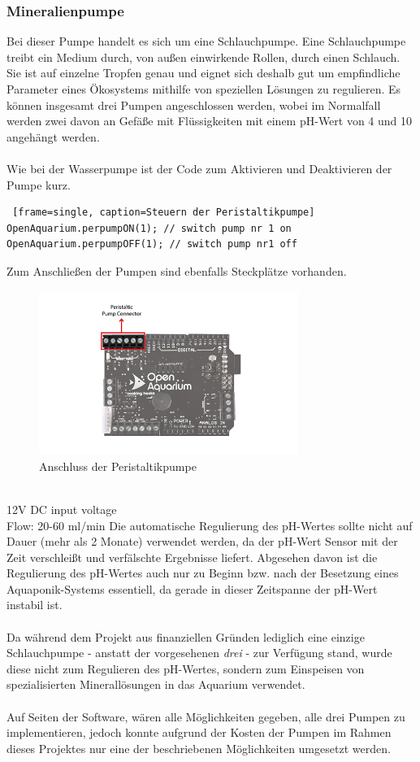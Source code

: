 \newpage
\subsubsection{Mineralienpumpe}
Bei dieser Pumpe handelt es sich um eine Schlauchpumpe. Eine Schlauchpumpe treibt ein Medium durch, von außen einwirkende Rollen, durch einen Schlauch. Sie ist auf einzelne Tropfen genau und eignet sich deshalb gut um  empfindliche Parameter eines Ökosystems mithilfe von speziellen Lösungen zu regulieren. Es können insgesamt drei Pumpen angeschlossen werden, wobei im Normalfall werden zwei davon an Gefäße mit Flüssigkeiten mit einem pH-Wert von 4 und 10 angehängt werden. \cite{hitec-zang} \\ \mbox{} \\
Wie bei der Wasserpumpe ist der Code zum Aktivieren und Deaktivieren der Pumpe kurz.
\begin{lstlisting} [frame=single, caption=Steuern der Peristaltikpumpe]
OpenAquarium.perpumpON(1); // switch pump nr 1 on
OpenAquarium.perpumpOFF(1); // switch pump nr1 off
\end{lstlisting}
Zum Anschließen der Pumpen sind ebenfalls Steckplätze vorhanden. \\
\begin{figure}[ht]
    \centering
    \includegraphics[height=2.1in]{images/mineral_pump_connection}
    \caption{Anschluss der Peristaltikpumpe}
\end{figure} \\
12V DC input voltage \\
Flow: 20-60 ml/min \cite{PeristaltikPump}
\newpage
{}
Die automatische Regulierung des pH-Wertes sollte nicht auf Dauer (mehr als 2 Monate) verwendet werden, da der pH-Wert Sensor mit der Zeit verschleißt und verfälschte Ergebnisse liefert. Abgesehen davon ist die Regulierung des pH-Wertes auch nur zu Beginn bzw. nach der Besetzung eines Aquaponik-Systems essentiell, da gerade in dieser Zeitspanne der pH-Wert instabil ist.  \\ \mbox{} \\
Da während dem Projekt aus finanziellen Gründen lediglich eine einzige Schlauchpumpe - anstatt der vorgesehenen \textit{drei} - zur Verfügung stand, wurde diese nicht zum Regulieren des pH-Wertes, sondern zum Einspeisen von spezialisierten Minerallösungen in das Aquarium verwendet. \\ \mbox{} \\
Auf Seiten der Software, wären alle Möglichkeiten gegeben, alle drei Pumpen zu implementieren, jedoch konnte aufgrund der Kosten der Pumpen im Rahmen dieses Projektes nur eine der beschriebenen Möglichkeiten umgesetzt werden. 

